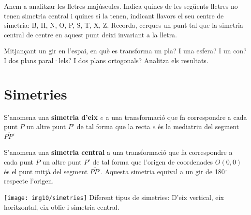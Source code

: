 \begin{mylist}

\exer  Anem a analitzar les lletres majúscules. Indica quines de les següents lletres no tenen simetria central i quines si la tenen, indicant llavors el seu centre de simetria: B, H, N, O, P, S, T, X, Z. Recorda, cerques un punt tal que la simetria central de centre en aquest punt deixi invariant a la lletra.


\exer  Mitjançant un gir en l'espai, en què es transforma un pla? I una esfera? I un con? I dos plans paral·lels? I dos plans ortogonals? Analitza els resultats.

\end{mylist}
 

\pagebreak
\section{Simetries}

\begin{theorybox}
	S'anomena una \textbf{simetria d'eix $e$} a una transformació que fa correspondre a cada punt $P$ un altre punt $P'$ de tal forma que la recta $e$ és la mediatriu del segment $\overline{PP'}$
	
	S'anomena una \textbf{simetria central} a una transformació que fa correspondre a cada punt $P$ un altre punt $P'$ de tal forma que l'origen de coordenades $O(0,0)$ és el punt mitjà del segment $\overline{PP'}$. Aquesta simetria equival a un gir de 180${}^\circ$ respecte l'origen.
	
	\begin{center}
		\texttt{[image: img10/simetries]}
			\footnotesize
		Diferent tipus de simetries: D'eix vertical, eix horitzontal, eix oblic i simetria central.
	\end{center}
\end{theorybox}

